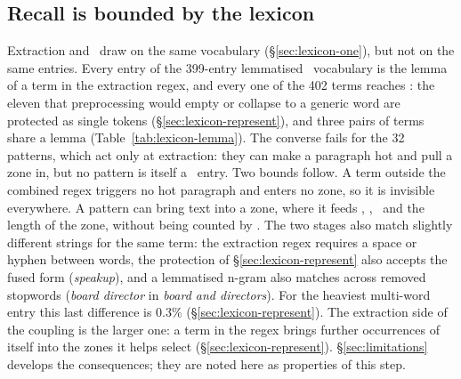 \subsection{Recall is bounded by the lexicon}

Extraction and \SUS\ draw on the same vocabulary (\S\ref{sec:lexicon-one}),
but not on the same entries. Every entry of the 399-entry lemmatised \SUS\
vocabulary is the lemma of a term in the extraction regex, and every one of
the 402 terms reaches \SUS: the eleven that preprocessing would empty or
collapse to a generic word are protected as single tokens
(\S\ref{sec:lexicon-represent}), and three pairs of terms share a lemma
(Table~\ref{tab:lexicon-lemma}). The converse fails for the 32 patterns,
which act only at extraction: they can make a paragraph hot and pull a zone
in, but no pattern is itself a \SUS\ entry.
Two bounds follow. A term outside the combined regex triggers no hot
paragraph and enters no zone, so it is invisible everywhere. A pattern can
bring text into a zone, where it feeds \SEN, \QUANT, \HEDGE\ and the length
of the zone, without being counted by \SUS. The two stages also match
slightly different strings for the same term: the extraction regex requires a
space or hyphen between words, the protection of \S\ref{sec:lexicon-represent}
also accepts the fused form (\emph{speakup}), and a lemmatised n-gram also
matches across removed stopwords (\emph{board director} in \emph{board and
directors}). For the heaviest multi-word entry this last difference is 0.3\%
(\S\ref{sec:lexicon-represent}). The extraction side of the coupling is the
larger one: a term in the regex brings further occurrences of itself into the
zones it helps select (\S\ref{sec:lexicon-represent}).
\S\ref{sec:limitations} develops the consequences; they are noted here as
properties of this step.
